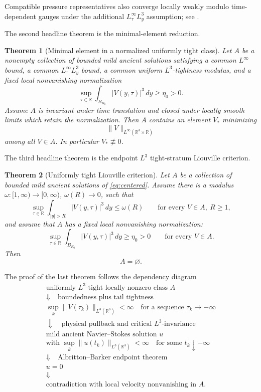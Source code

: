\documentclass[11pt]{amsart}
\theoremstyle{plain}
\newtheorem{theorem}{Theorem}[section]
\theoremstyle{definition}
\theoremstyle{remark}
\numberwithin{equation}{section}
\newcommand{\R}{\mathbb R}
\begin{document}
Compatible pressure representatives also converge locally weakly modulo
time-dependent gauges under the additional \(L^\infty_\tau L^3_y\) assumption;
see .

The second headline theorem is the minimal-element reduction.

\begin{theorem}[Minimal element in a normalized uniformly tight class]
\label{thm:minimal-tight-intro}
Let \(A\) be a nonempty collection of bounded mild ancient solutions satisfying
a common \(L^\infty\) bound, a common \(L^\infty_\tau L^3_y\) bound, a common
uniform \(L^3\)-tightness modulus, and a fixed local nonvanishing
normalization
\[
   \sup_{\tau\in\R}\int_{B_{R_0}}|V(y,\tau)|^3\,dy\ge \eta_0>0.
\]
Assume \(A\) is invariant under time translation and closed under locally
smooth limits which retain the normalization.  Then \(A\) contains an element
\(V_*\) minimizing
\[
   \|V\|_{L^\infty(\R^3\times\R)}
\]
among all \(V\in A\).  In particular \(V_*\not\equiv0\).
\end{theorem}

The third headline theorem is the endpoint \(L^3\) tight-stratum Liouville
criterion.

\begin{theorem}[Uniformly tight Liouville criterion]
\label{thm:tight-liouville-intro}
Let \(A\) be a collection of bounded mild ancient solutions of
\eqref{eq:centered}.  Assume there is a modulus
\(\omega:[1,\infty)\to[0,\infty)\), \(\omega(R)\to0\), such that
\[
   \sup_{\tau\in\R}
   \int_{|y|>R}|V(y,\tau)|^3\,dy\le\omega(R)
   \qquad\text{for every }V\in A,\ R\ge1,
\]
and assume that \(A\) has a fixed local nonvanishing normalization:
\[
   \sup_{\tau\in\R}\int_{B_{R_0}}|V(y,\tau)|^3\,dy\ge\eta_0>0
   \qquad\text{for every }V\in A.
\]
Then
\[
   A=\varnothing .
\]
\end{theorem}

The proof of the last theorem follows the dependency diagram
\[
\begin{array}{c}
\text{uniformly \(L^3\)-tight locally nonzero class }A\\[2mm]
\Downarrow\quad\text{boundedness plus tail tightness}\\[2mm]
\sup_k\|V(\tau_k)\|_{L^3(\R^3)}<\infty
\quad\text{for a sequence }\tau_k\to-\infty\\[2mm]
\Downarrow\quad\text{physical pullback and critical \(L^3\)-invariance}\\[2mm]
\text{mild ancient Navier--Stokes solution }u\\[1mm]
\text{with }\sup_k\|u(t_k)\|_{L^3(\R^3)}<\infty
\quad\text{for some }t_k\downarrow-\infty\\[2mm]
\Downarrow\quad\text{Albritton--Barker endpoint theorem}\\[2mm]
u=0\\[2mm]
\Downarrow\\[2mm]
\text{contradiction with local velocity nonvanishing in }A .
\end{array}
\]
\end{document}
